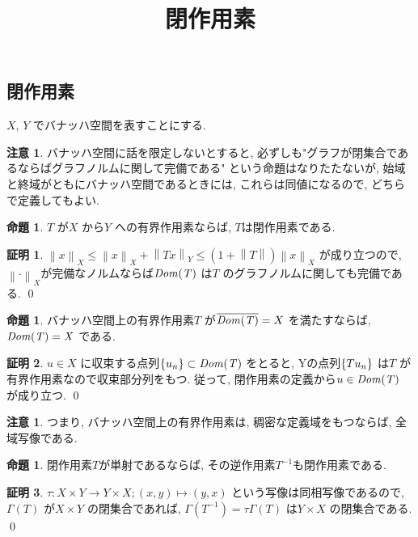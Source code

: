 \documentclass[10pt, fleqn, label-section=none]{bxjsarticle}
\title{閉作用素}
\date{}
\author{}
\theoremstyle{definition}
\newtheorem{prop}[dfn]{命題}
\newtheorem*{pf*}{証明}
\newtheorem{remark}[dfn]{注意}
\newcommand{\cbra}[1]{\mleft\{#1\mright\}}
\newcommand{\norm}[1]{\left\|#1\right\|}
\renewcommand{\;}{\, ; \,}
\begin{document}
\maketitle

\section{}

\subsection{閉作用素}

$X$, $Y$ でバナッハ空間を表すことにする.
\begin{remark}
バナッハ空間に話を限定しないとすると, 必ずしも"グラフが閉集合であるならばグラフノルムに関して完備である" という命題はなりたたないが, 始域と終域がともにバナッハ空間であるときには, これらは同値になるので, どちらで定義してもよい. 
\end{remark}

\begin{prop}
$T$ が$X$ から$Y$ への有界作用素ならば, $T$は閉作用素である.
\end{prop}
\begin{pf*}
$\norm{x}_X \leq \norm{x}_X + \norm{Tx}_Y \leq (1 + \norm{T})\norm{x}_X$ が成り立つので, $\norm{\cdot}_X $が完備なノルムならば$\it{Dom}(T)$ は$T$ のグラフノルムに関しても完備である.
\qed
\end{pf*}

\begin{prop}
バナッハ空間上の有界作用素$T$ が$\overline{\it{Dom}(T)} = X$ を満たすならば,  $\it{Dom}(T) = X$ である.
\end{prop}
\begin{pf*}
$u \in X$ に収束する点列$\cbra{u_n} \subset \it{Dom}(T)$ をとると, Yの点列$\cbra{Tu_n}$ は$T$ が有界作用素なので収束部分列をもつ.
従って, 閉作用素の定義から$u \in \it{Dom}(T)$ が成り立つ.
\qed
\end{pf*}

\begin{remark}
つまり, バナッハ空間上の有界作用素は, 稠密な定義域をもつならば, 全域写像である. 
\end{remark}

\begin{prop}
閉作用素$T$が単射であるならば, その逆作用素$T^{-1}$も閉作用素である.
\end{prop}
\begin{pf*}
$\tau:X\times Y \rightarrow Y \times X ; (x,y) \mapsto (y,x)$ という写像は同相写像であるので, $\Gamma (T)$ が$X \times Y$ の閉集合であれば, $\Gamma(T ^{-1}) = \tau \Gamma(T)$ は$Y \times X$ の閉集合である.
\qed
\end{pf*}
\end{document}
